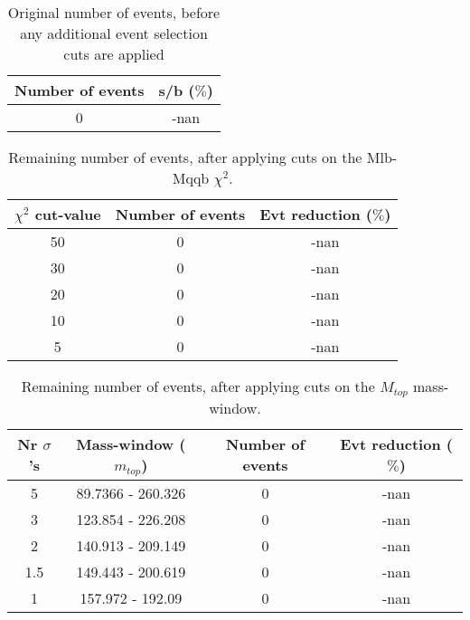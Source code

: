 \documentclass{article}
\begin{document}
 

 \begin{abstract} 
 
   The tables in this document represent the influence of the additional event selection cuts that were applied in order to reduce the number of selected events for CPU reasons. \\ 
   The considered cuts are rather basic and are merely developed to reduce the number of so-called wrong events \\ 
   \begin{itemize} 
     \item Cut on Mlb-Mqqb $\chi^{2}$ distribution 
     \item Cut on top and W-mass window 
   \end{itemize} 
 
   \textbf{Created on :} \today 
 \end{abstract} 
 
 \begin{table}[h!t] 
  \caption{Original number of events, before any additional event selection cuts are applied} 
  \centering 
   \begin{tabular}{c|c} 
     Number of events    & s/b ($\%$)     \\ 
     \hline
     0  & -nan 
 
   \end{tabular} 
 \end{table} 
 
 \begin{table}[h!t] 
  \caption{Remaining number of events, after applying cuts on the Mlb-Mqqb $\chi^{2}$.} 
  \centering 
   \begin{tabular}{c|c|c|} 
     $\chi^{2}$ cut-value    & Number of events  & Evt reduction ($\%$)    \\ 
     \hline
     50  &   0  &  -nan \\ 
     30  &   0  &  -nan \\ 
     20  &   0  &  -nan \\ 
     10  &   0  &  -nan \\ 
     5  &   0  &  -nan \\ 
   \end{tabular} 
 \end{table} 
 
 \begin{table}[h!t] 
  \caption{Remaining number of events, after applying cuts on the $M_{top}$ mass-window.} 
  \centering 
   \begin{tabular}{c|c|c|c|}
     Nr $\sigma$'s & Mass-window ($m_{top}$)   & Number of events   & Evt reduction ($\%$)     \\
     \hline
     5 & 89.7366 - 260.326  &   0 &  -nan \\ 
     3 & 123.854 - 226.208  &   0 &  -nan \\ 
     2 & 140.913 - 209.149  &   0 &  -nan \\ 
     1.5 & 149.443 - 200.619  &   0 &  -nan \\ 
     1 & 157.972 - 192.09  &   0 &  -nan \\ 
   \end{tabular} 
 \end{table} 
 
\end{document}
